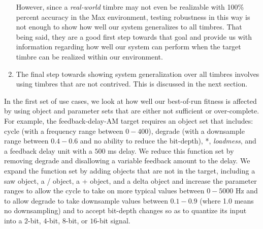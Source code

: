 \documentclass[12pt]{report} 	%
\numberwithin{figure}{chapter}
\numberwithin{table}{chapter}
\numberwithin{equation}{chapter}
\begin{document}
\begin{flushleft}
\begin{enumerate}
However, since a \textit{real-world} timbre may not even be realizable with 100\% percent accuracy in the Max environment, testing robustness in this way is not enough to show how well our system generalizes to all timbres. That being said, they are a good first step towards that goal and provide us with information regarding how well our system can perform when the target timbre can be realized within our environment.
\item The final step towards showing system generalization over all timbres involves using timbres that are not contrived. This is discussed in the next section.
\end{enumerate}

In the first set of use cases, we look at how well our best-of-run fitness is affected by using object and parameter sets that are either not sufficient or over-complete. For example, the feedback-delay-AM target requires an object set that includes: cycle\texttildelow{} (with a frequency range between $0-400$), degrade\texttildelow{} (with a downsample range between $0.4 - 0.6$ and no ability to reduce the bit-depth), *\texttildelow{}, \textit{loadmess}, and a feedback delay unit with a $500$ ms delay. We reduce this function set by removing degrade\texttildelow{} and disallowing a variable feedback amount to the delay. We expand the function set by adding objects that are not in the target, including a saw\texttildelow{} object, a /\texttildelow{} object, a +\texttildelow{} object, and a delta\texttildelow{} object and increase the parameter ranges to allow the cycle\texttildelow{}  to take on more typical values between $0-5000$ Hz and to allow degrade\texttildelow{}  to take downsample values between $0.1-0.9$ (where 1.0 means no downsampling) and to accept bit-depth changes so as to quantize its input into a $2$-bit, $4$-bit, $8$-bit, or $16$-bit signal. 


\end{flushleft}
\end{document}
